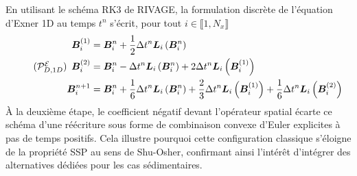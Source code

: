 \documentclass[11pt, a4paper, oneside]{report}
\begin{document}
En utilisant le schéma RK3 de RIVAGE, la formulation discrète de l'équation d'Exner 1D au temps $t^n$ s'écrit, pour tout $i \in \llbracket 1, N_x \rrbracket$
\begin{equation} \tag{$\mathcal{P}_{D, 1D}^\mathcal{E}$} \label{eq:Probleme_discret_exner_1D}
    \begin{aligned}
        \bm{B}_i^{(1)} & = \bm{B}_i^n + \frac{1}{2} \Delta t^n \bm{L}_i \left( \bm{B}_i^n \right) \\
        \bm{B}_i^{(2)} & = \bm{B}_i^n - \Delta t^n \bm{L}_i \left( \bm{B}_i^n \right) + 2 \Delta t^n \bm{L}_i \left( \bm{B}_i^{(1)} \right) \\
        \bm{B}_i^{n+1} & = \bm{B}_i^n + \frac{1}{6} \Delta t^n \bm{L}_i \left( \bm{B}_i^n \right) + \frac{2}{3} \Delta t^n \bm{L}_i \left( \bm{B}_i^{(1)} \right) + \frac{1}{6} \Delta t^n \bm{L}_i \left( \bm{B}_i^{(2)} \right)
    \end{aligned}
\end{equation}
À la deuxième étape, le coefficient négatif devant l'opérateur spatial écarte ce schéma d'une réécriture sous forme de combinaison convexe d'Euler explicites à pas de temps positifs. Cela illustre pourquoi cette configuration classique s'éloigne de la propriété SSP au sens de Shu-Osher, confirmant ainsi l'intérêt d'intégrer des alternatives dédiées pour les cas sédimentaires. \\
\end{document}
